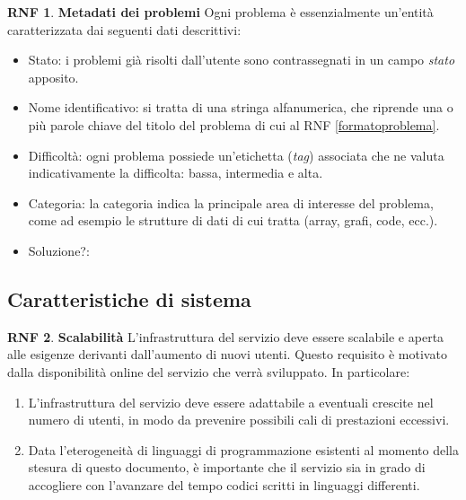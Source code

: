\documentclass[11pt, a4paper]{article}
\theoremstyle{definition}
\newtheorem{nonfuncreq}{RNF} %
\begin{document}
\begin{nonfuncreq}
\label{metadata}
\textbf{Metadati dei problemi } Ogni problema è essenzialmente un'entità
caratterizzata dai seguenti dati descrittivi:
\begin{itemize}
    \item Stato: i problemi già risolti dall'utente sono contrassegnati
    in un campo \textit{stato} apposito.

    \item Nome identificativo: si tratta di una stringa alfanumerica, che
    riprende una o più parole chiave del titolo del problema di cui al
    RNF \ref{formatoproblema}.
    
    \item Difficoltà: ogni problema possiede un'etichetta (\textit{tag})
    associata che ne valuta indicativamente la difficolta: bassa,
    intermedia e alta.

    \item Categoria: la categoria indica la principale area di interesse
    del problema, come ad esempio le strutture di dati di cui tratta
    (array, grafi, code, ecc.).

    \item Soluzione?:
\end{itemize}
\end{nonfuncreq}

\subsection{Caratteristiche di sistema}

\begin{nonfuncreq}
\label{scalabilita}
\textbf{Scalabilità }
L'infrastruttura del servizio deve essere scalabile e aperta alle esigenze
derivanti dall'aumento di nuovi utenti. Questo requisito è motivato dalla
disponibilità online del servizio che verrà sviluppato. In particolare:
\begin{enumerate}
    \item L'infrastruttura del servizio deve essere adattabile a eventuali
    crescite nel numero di utenti, in modo da prevenire possibili cali di
    prestazioni eccessivi.

    \item Data l'eterogeneità di linguaggi di programmazione esistenti
    al momento della stesura di questo documento, è importante che il
    servizio sia in grado di accogliere con l'avanzare del tempo codici
    scritti in linguaggi differenti.
\end{enumerate}
\end{nonfuncreq}
\end{document}
